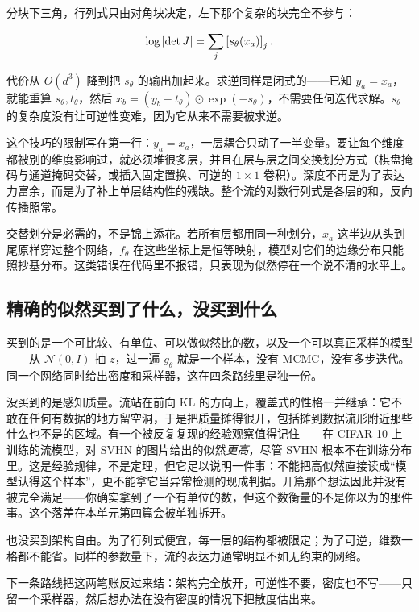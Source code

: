 分块下三角，行列式只由对角块决定，左下那个复杂的块完全不参与：

\[
\log\left|\det J\right|=\sum_j \left[s_\theta(x_a)\right]_j .
\]

代价从 \(O(d^3)\) 降到把 \(s_\theta\) 的输出加起来。求逆同样是闭式的——已知 \(y_a=x_a\)，就能重算 \(s_\theta,t_\theta\)，然后 \(x_b=(y_b-t_\theta)\odot\exp(-s_\theta)\)，不需要任何迭代求解。\(s_\theta\) 的复杂度没有让可逆性变难，因为它从来不需要被求逆。

这个技巧的限制写在第一行：\(y_a=x_a\)，一层耦合只动了一半变量。要让每个维度都被别的维度影响过，就必须堆很多层，并且在层与层之间交换划分方式（棋盘掩码与通道掩码交替，或插入固定置换、可逆的 \(1\times1\) 卷积）。深度不再是为了表达力富余，而是为了补上单层结构性的残缺。整个流的对数行列式是各层的和，反向传播照常。

\begin{remark}
交替划分是必需的，不是锦上添花。若所有层都用同一种划分，\(x_a\) 这半边从头到尾原样穿过整个网络，\(f_\theta\) 在这些坐标上是恒等映射，模型对它们的边缘分布只能照抄基分布。这类错误在代码里不报错，只表现为似然停在一个说不清的水平上。
\end{remark}

\subsection{精确的似然买到了什么，没买到什么}

买到的是一个可比较、有单位、可以做似然比的数，以及一个可以真正采样的模型——从 \(\mathcal N(0,I)\) 抽 \(z\)，过一遍 \(g_\theta\) 就是一个样本，没有 MCMC，没有多步迭代。同一个网络同时给出密度和采样器，这在四条路线里是独一份。

没买到的是感知质量。流站在前向 KL 的方向上，覆盖式的性格一并继承：它不敢在任何有数据的地方留空洞，于是把质量摊得很开，包括摊到数据流形附近那些什么也不是的区域。有一个被反复复现的经验观察值得记住——在 CIFAR-10 上训练的流模型，对 SVHN 的图片给出的似然\emph{更高}，尽管 SVHN 根本不在训练分布里。这是经验规律，不是定理，但它足以说明一件事：不能把高似然直接读成``模型认得这个样本''，更不能拿它当异常检测的现成判据。开篇那个想法因此并没有被完全满足——你确实拿到了一个有单位的数，但这个数衡量的不是你以为的那件事。这个落差在本单元第四篇会被单独拆开。

也没买到架构自由。为了行列式便宜，每一层的结构都被限定；为了可逆，维数一格都不能省。同样的参数量下，流的表达力通常明显不如无约束的网络。

下一条路线把这两笔账反过来结：架构完全放开，可逆性不要，密度也不写——只留一个采样器，然后想办法在没有密度的情况下把散度估出来。
